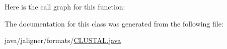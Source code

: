 Here is the call graph for this function\+:




The documentation for this class was generated from the following file\+:\begin{DoxyCompactItemize}
\item 
java/jaligner/formats/\hyperlink{_c_l_u_s_t_a_l_8java}{C\+L\+U\+S\+T\+A\+L.\+java}\end{DoxyCompactItemize}
